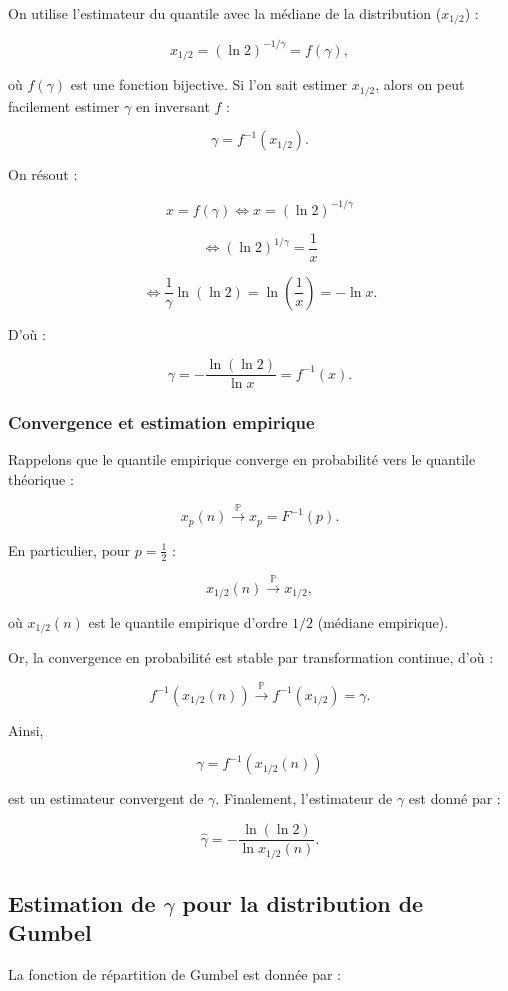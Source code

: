 \documentclass{article}
\begin{document}
On utilise l'estimateur du quantile avec la médiane de la distribution (\(x_{1/2}\)) :

\[
x_{1/2} = (\ln 2)^{-1/\gamma} = f(\gamma),
\]

où \(f(\gamma)\) est une fonction bijective.  
Si l'on sait estimer \(x_{1/2}\), alors on peut facilement estimer \(\gamma\) en inversant \(f\) :

\[
\gamma = f^{-1}(x_{1/2}).
\]

On résout :

\[
x = f(\gamma) \iff x = (\ln 2)^{-1/\gamma}
\]

\[
\iff (\ln 2)^{1/\gamma} = \frac{1}{x}
\]

\[
\iff \frac{1}{\gamma} \ln (\ln 2) = \ln \left(\frac{1}{x}\right) = -\ln x.
\]

D'où :

\[
\gamma = -\frac{\ln (\ln 2)}{\ln x} = f^{-1}(x).
\]

\subsubsection{Convergence et estimation empirique}

Rappelons que le quantile empirique converge en probabilité vers le quantile théorique :

\[
x_p(n) \xrightarrow{\mathbb{P}} x_p = F^{-1}(p).
\]

En particulier, pour \(p = \frac{1}{2}\) :

\[
x_{1/2}(n) \xrightarrow{\mathbb{P}} x_{1/2},
\]

où \(x_{1/2}(n)\) est le quantile empirique d'ordre \(1/2\) (médiane empirique).  

Or, la convergence en probabilité est stable par transformation continue, d'où :

\[
f^{-1}(x_{1/2}(n)) \xrightarrow{\mathbb{P}} f^{-1}(x_{1/2}) = \gamma.
\]

Ainsi, 

\[
\gamma = f^{-1}(x_{1/2}(n))
\]

est un estimateur convergent de \(\gamma\).  
Finalement, l'estimateur de \(\gamma\) est donné par :

\[
\hat{\gamma} = -\frac{\ln (\ln 2)}{\ln x_{1/2}(n)}.
\]
\subsection{Estimation de \(\gamma\) pour la distribution de Gumbel}

La fonction de répartition de Gumbel est donnée par :
\end{document}
